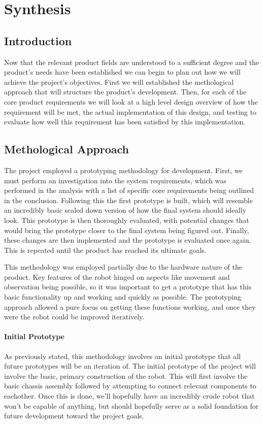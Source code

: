 \part{Synthesis}
	\chapter{Introduction}
	Now that the relevant product fields are understood to a sufficient degree and the product's needs have been established we can begin to plan out how we will achieve the project's objectives. First we will established the methological approach that will structure the product's development. Then, for each of the core product requirements we will look at a high level design overview of how the requirement will be met, the actual implementation of this design, and testing to evaluate how well this requirement has been satisfied by this implementation.
	
	\chapter{Methological Approach}
	The project employed a prototyping methodology for development. First, we must perform an investigation into the system requirements, which was performed in the analysis with a list of specific core requirements being outlined in the conclusion. Following this the first prototype is built, which will resemble an incredibly basic scaled down version of how the final system should ideally look. This prototype is then thoroughly evaluated, with potential changes that would bring the prototype closer to the final system being figured out. Finally, these changes are then implemented and the prototype is evaluated once again. This is repeated until the product has reached its ultimate goals.
	
	
	This methodology was employed partially due to the hardware nature of the product. Key features of the robot hinged on aspects like movement and observation being possible, so it was important to get a prototype that has this basic functionality up and working and quickly as possible. The prototyping approach allowed a pure focus on getting these functions working, and once they were the robot could be improved iteratively.
	
		\subsection{Initial Prototype}
		As previously stated, this methodology involves an initial prototype that all future prototypes will be an iteration of. The initial prototype of the project will involve the basic, primary construction of the robot. This will first involve the basic chassis assembly followed by attempting to connect relevant components to eachother. Once this is done, we'll hopefully have an incredibly crude robot that won't be capable of anything, but should hopefully serve as a solid foundation for future development toward the project goals.
		
